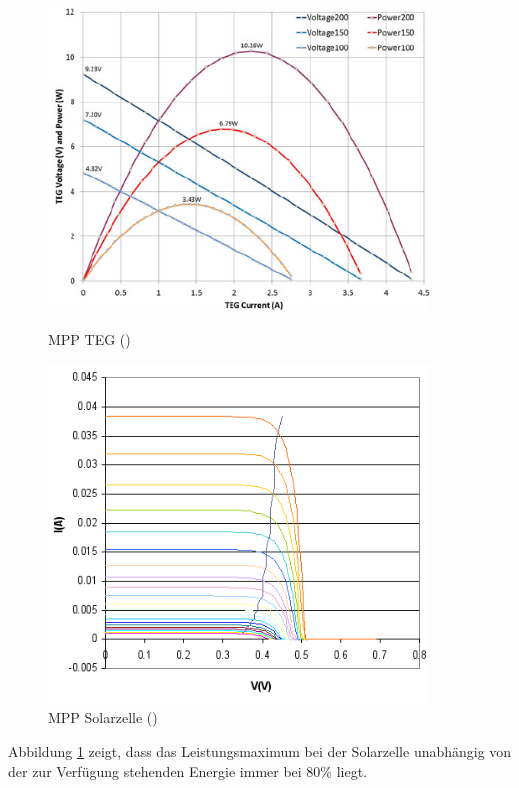 \begin{figure}[ht]
 \begin{minipage}[t]{0.5\textwidth}
 \includegraphics[width=0.9\textwidth]{2TheoretischeGrundlagen/imag/MPPTEG.png}
\caption{MPP TEG (\cite{MPP_TEG})}
\label{teg} 
 \end{minipage}
 \begin{minipage}[t]{0.5\textwidth}
    \includegraphics[width=0.9\textwidth]{2TheoretischeGrundlagen/imag/MPPSolar.png} 
    \caption{MPP Solarzelle (\cite{mpp_solar})}
    \label{mppsolar}
 \end{minipage}
\end{figure}

Abbildung \ref{mppsolar} zeigt, dass das Leistungsmaximum bei der Solarzelle unabhängig von der zur Verfügung stehenden Energie immer bei 80\thinspace\% liegt.

